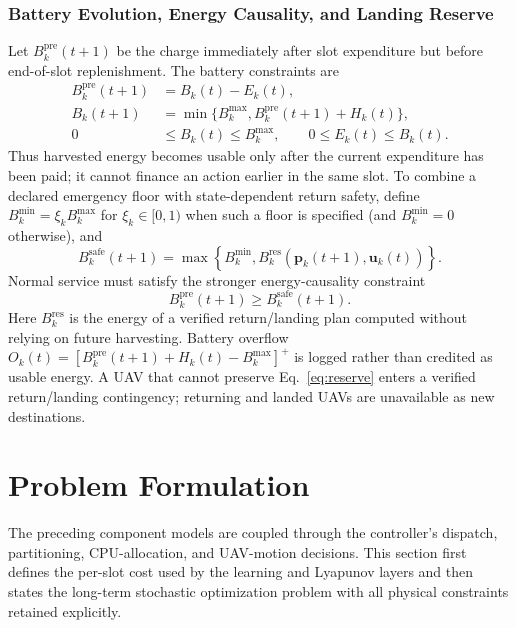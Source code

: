 \subsubsection{Battery Evolution, Energy Causality, and Landing Reserve}
Let $B_k^{\mathrm{pre}}(t+1)$ be the charge immediately after slot
expenditure but before end-of-slot replenishment. The battery constraints are
\begin{equation}
\begin{aligned}
B_k^{\mathrm{pre}}(t+1)&=B_k(t)-E_k(t),\\
B_k(t+1)&=\min\{B_k^{\max},
B_k^{\mathrm{pre}}(t+1)+H_k(t)\},\\
0&\le B_k(t)\le B_k^{\max},\qquad
0\le E_k(t)\le B_k(t).
\end{aligned}
\label{eq:battery}
\end{equation}
Thus harvested energy becomes usable only after the current expenditure has
been paid; it cannot finance an action earlier in the same slot. To combine
a declared emergency floor with state-dependent return safety, define
$B_k^{\min}=\xi_kB_k^{\max}$ for $\xi_k\in[0,1)$ when such a floor is
specified (and $B_k^{\min}=0$ otherwise), and
\[
B_k^{\mathrm{safe}}(t+1)=\max\!\left\{B_k^{\min},
B_k^{\mathrm{res}}(\boldsymbol p_k(t+1),\boldsymbol u_k(t))\right\}.
\]
Normal service must satisfy the stronger energy-causality constraint
\begin{equation}
B_k^{\mathrm{pre}}(t+1)\ge B_k^{\mathrm{safe}}(t+1).
\label{eq:reserve}
\end{equation}
Here $B_k^{\mathrm{res}}$ is the energy of a verified return/landing plan
computed without relying on future harvesting. Battery overflow
$O_k(t)=[B_k^{\mathrm{pre}}(t+1)+H_k(t)-B_k^{\max}]^+$ is logged rather
than credited as usable energy. A UAV that cannot preserve
Eq.~\eqref{eq:reserve} enters a verified return/landing contingency;
returning and landed UAVs are unavailable as new destinations.

\section{Problem Formulation}
\label{problem_formulation}

The preceding component models are coupled through the controller's dispatch,
partitioning, CPU-allocation, and UAV-motion decisions. This section first
defines the per-slot cost used by the learning and Lyapunov layers and then
states the long-term stochastic optimization problem with all physical
constraints retained explicitly.

